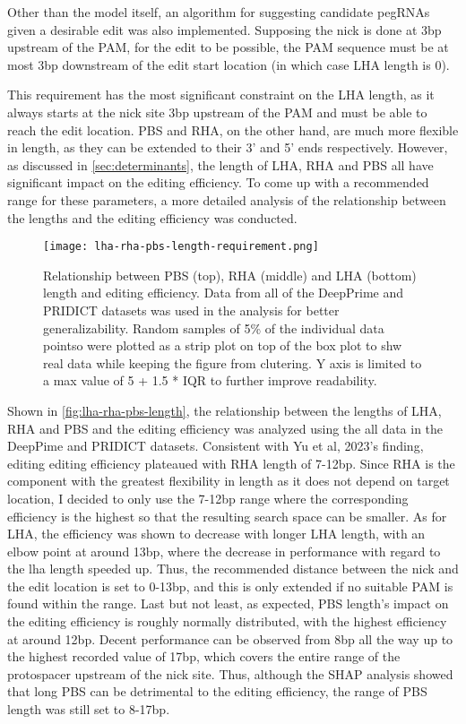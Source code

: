 Other than the model itself, an algorithm for suggesting candidate pegRNAs given a desirable edit was also implemented. Supposing the nick is done at 3bp upstream of the PAM, for the edit to be possible, the PAM sequence must be at most 3bp downstream of the edit start location (in which case LHA length is 0). 

This requirement has the most significant constraint on the LHA length, as it always starts at the nick site 3bp upstream of the PAM and must be able to reach the edit location. PBS and RHA, on the other hand, are much more flexible in length, as they can be extended to their 3' and 5' ends respectively.
However, as discussed in \autoref{sec:determinants}, the length of LHA, RHA and PBS all have significant impact on the editing efficiency. To come up with a recommended range for these parameters, a more detailed analysis of the relationship between the lengths and the editing efficiency was conducted.

\begin{figure}
    \texttt{[image: lha-rha-pbs-length-requirement.png]}
    \caption[Relationship between LHA, RHA and PBS length and editing efficiency]{Relationship between PBS (top), RHA (middle) and LHA (bottom) length and editing efficiency. Data from all of the DeepPrime and PRIDICT datasets was used in the analysis for better generalizability. Random samples of 5\% of the individual data pointso were plotted as a strip plot on top of the box plot to shw real data while keeping the figure from clutering. Y axis is limited to a max value of 5 + 1.5 * IQR to further improve readability. }
    \label{fig:lha-rha-pbs-length}
\end{figure}


Shown in \autoref{fig:lha-rha-pbs-length}, the relationship between the lengths of LHA, RHA and PBS and the editing efficiency was analyzed using the all data in the DeepPime and PRIDICT datasets. Consistent with Yu et al, 2023's finding, editing editing efficiency plateaued with RHA length of 7-12bp. Since RHA is the component with the greatest flexibility in length as it does not depend on target location, I decided to only use the 7-12bp range where the corresponding efficiency is the highest so that the resulting search space can be smaller.  As for LHA, the efficiency was shown to decrease with longer LHA length, with an elbow point at around 13bp, where the decrease in performance with regard to the lha length speeded up. Thus, the recommended distance between the nick and the edit location is set to 0-13bp, and this is only extended if no suitable PAM is found within the range. Last but not least, as expected, PBS length's impact on the editing efficiency is roughly normally distributed, with the highest efficiency at around 12bp. Decent performance can be observed from 8bp all the way up to the highest recorded value of 17bp, which covers the entire range of the protospacer upstream of the nick site. Thus, although the SHAP analysis showed that long PBS can be detrimental to the editing efficiency, the range of PBS length was still set to 8-17bp.

